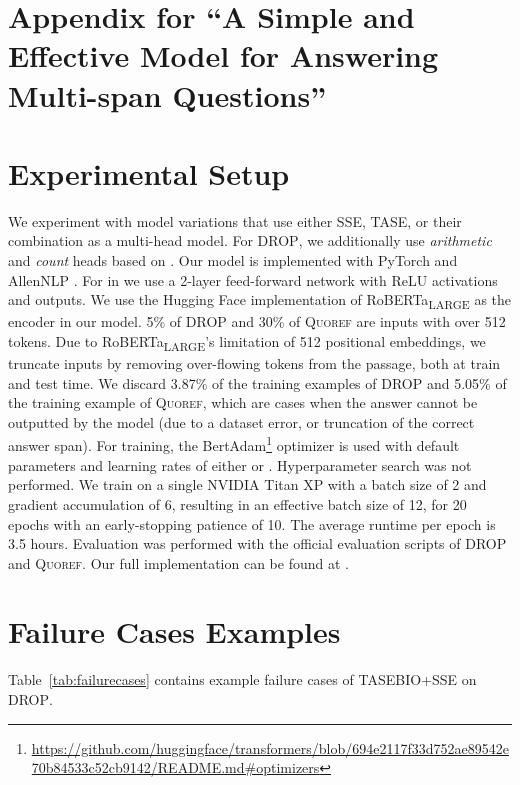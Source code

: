 \documentclass[11pt,a4paper]{article}
\newcommand{\ifappendix}[2]{\ifdef{\withappendix}{#1}{#2}}
\newcommand{\papername}{A Simple and Effective Model for Answering Multi-span Questions}
\newcommand{\drop}{\textsc{DROP}}
\newcommand{\quoref}{\textsc{Quoref}}
\newcommand{\roberta}{RoBERTa\textsubscript{\tiny{\textsc{LARGE}}}\text{}}
\begin{document}
\setlength{\abovedisplayskip}{2pt}
\setlength{\belowdisplayskip}{2pt}

\renewcommand\thetable{2}
\appendix
\section*{Appendix for ``\papername''}
\section{Experimental Setup}
\label{app:setup}
We experiment with model variations that use either SSE, TASE, or their combination as a multi-head model. For \drop{}, we additionally use \textit{arithmetic} and \textit{count} heads based on \cite{Dua2019DROP, nabert+}.
Our model is implemented with PyTorch \cite{NEURIPS2019_9015} and AllenNLP \cite{Gardner2017AllenNLP}.
For  in \ifappendix{Eq.~\eqref{eq:tag_prob}}{Eq. (1)} we use a 2-layer feed-forward network with ReLU activations and  outputs.
We use the Hugging Face implementation of \roberta{} \cite{Wolf2019HuggingFacesTS, liu2019roberta} as the encoder in our model. 5\% of \drop{} and 30\% of \quoref{} are inputs with over 512 tokens.
Due to \roberta{}'s limitation of 512 positional embeddings, we truncate inputs by removing over-flowing tokens from the passage, both at train and test time. We discard 3.87\% of the training examples of \drop{} and 5.05\% of the training example of \quoref{}, which are cases when the answer cannot be outputted by the model (due to a dataset error, or truncation of the correct answer span).
For training, the BertAdam\footnote{\url{https://github.com/huggingface/transformers/blob/694e2117f33d752ae89542e70b84533c52cb9142/README.md\#optimizers}} optimizer is used with default parameters and learning rates of either  or . Hyperparameter search was not performed. We train on a single NVIDIA Titan XP with a batch size of 2 and gradient accumulation of 6, resulting in an effective batch size of 12, for 20 epochs with an early-stopping patience of 10. The average runtime per epoch is 3.5 hours.
Evaluation was performed with the official evaluation scripts of \drop{} and \quoref{}.
Our full implementation can be found at \href{\ifreadyelse{https://github.com/eladsegal/tag-based-multi-span-extraction}{https://anonymized}}{}. \section{Failure Cases Examples}
\label{app:error_analysis}
Table~\ref{tab:failurecases} contains example failure cases of TASE{\scriptsize BIO}+SSE on \drop{}.
\end{document}
